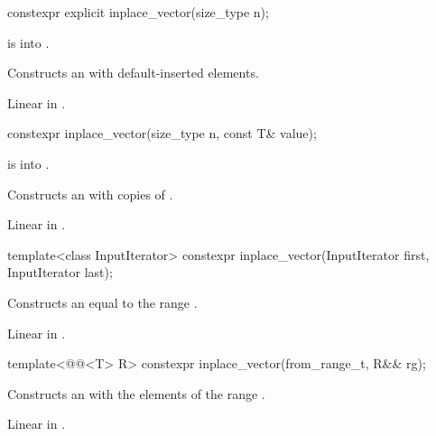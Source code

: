\begin{itemdecl}
constexpr explicit inplace_vector(size_type n);
\end{itemdecl}

\begin{itemdescr}
\pnum
\expects
{} is  into .

\pnum
\effects
Constructs an  with  default-inserted elements.

\pnum
\complexity
Linear in .
\end{itemdescr}

\begin{itemdecl}
constexpr inplace_vector(size_type n, const T& value);
\end{itemdecl}

\begin{itemdescr}
\pnum
\expects
{} is  into .

\pnum
\effects
Constructs an  with  copies of .

\pnum
\complexity
Linear in .
\end{itemdescr}

\begin{itemdecl}
template<class InputIterator>
  constexpr inplace_vector(InputIterator first, InputIterator last);
\end{itemdecl}

\begin{itemdescr}
\pnum
\effects
Constructs an  equal to the range .

\pnum
\complexity
Linear in .
\end{itemdescr}

\begin{itemdecl}
template<@@<T> R>
  constexpr inplace_vector(from_range_t, R&& rg);
\end{itemdecl}

\begin{itemdescr}
\pnum
\effects
Constructs an  with
the elements of the range .

\pnum
\complexity
Linear in .
\end{itemdescr}

